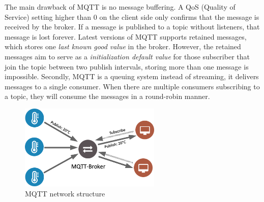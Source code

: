 The main drawback of MQTT is no message buffering. A QoS (Quality of Service) setting higher than 0 on the client side only confirms that the message is received by the broker. If a message is published to a topic without listeners, that message is lost forever. Latest versions of MQTT supports retained messages, which stores one \emph{last known good value} in the broker. However, the retained messages aim to serve as a \emph{initialization default value} for those subscriber that join the topic between two publish intervals, storing more than one message is impossible. Secondly, MQTT is a queuing system instead of streaming, it delivers messages to a single consumer. When there are multiple consumers subscribing to a topic, they will consume the messages in a round-robin manner.
\begin{figure}
  \centering
  \includegraphics[width=0.6\textwidth]{figures/mqtt.png}
  \caption{MQTT network structure}\label{fig:mqtt}
\end{figure}
